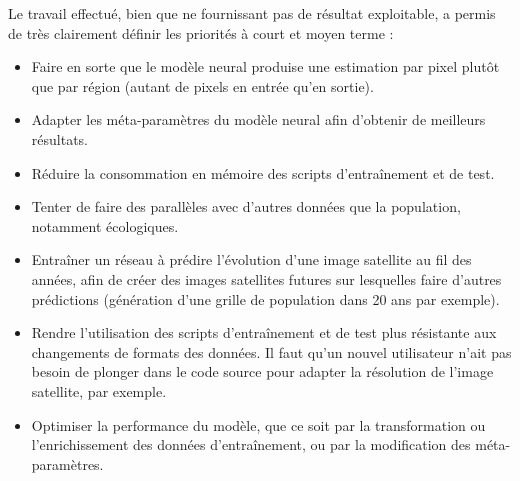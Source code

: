 \documentclass[a4paper, 11pt]{report}
\begin{document}
Le travail effectué, bien que ne fournissant pas de résultat exploitable, a permis de très clairement définir les priorités à court et moyen terme :
\begin{itemize}
	\item Faire en sorte que le modèle neural produise une estimation par pixel plutôt que par région (autant de pixels en entrée qu'en sortie).
	\item Adapter les méta-paramètres du modèle neural afin d'obtenir de meilleurs résultats.
	\item Réduire la consommation en mémoire des scripts d'entraînement et de test.
	\item Tenter de faire des parallèles avec d'autres données que la population, notamment écologiques.
	\item Entraîner un réseau à prédire l'évolution d'une image satellite au fil des années, afin de créer des images satellites futures sur lesquelles faire d'autres prédictions (génération d'une grille de population dans 20 ans par exemple).
	\item Rendre l'utilisation des scripts d'entraînement et de test plus résistante aux changements de formats des données. Il faut qu'un nouvel utilisateur n'ait pas besoin de plonger dans le code source pour adapter la résolution de l'image satellite, par exemple.
	\item Optimiser la performance du modèle, que ce soit par la transformation ou l'enrichissement des données d'entraînement, ou par la modification des méta-paramètres.
\end{itemize}

\printbibliography



\listoffigures

\end{document}
